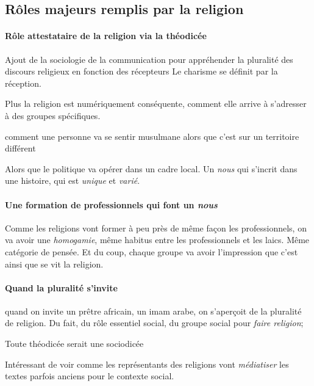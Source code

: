 \subsection{ Rôles majeurs remplis par la religion}

\paragraph{Rôle attestataire de la religion via la théodicée}
\begin{Prop}
         Ajout de la sociologie de la communication pour appréhender la pluralité des discours religieux en fonction des récepteurs 
         Le charisme se définit par la réception.    
\end{Prop}
Plus la religion est numériquement conséquente, comment elle arrive à s'adresser à des groupes spécifiques. 
\begin{Ex}
    comment une personne va se sentir musulmane alors que c'est sur un territoire différent
\end{Ex}
Alors que le politique va opérer dans un cadre local. Un \textit{nous} qui s'incrit dans une histoire, qui est \textit{unique} et \textit{varié}.

\paragraph{Une formation de professionnels qui font un \textit{nous}} Comme les religions vont former à peu près de même façon les professionnels, on va avoir une \textit{homogamie}, même habitus entre les professionnels et les laics. Même catégorie de pensée. Et du coup, chaque groupe va avoir l'impression que c'est ainsi que se vit la religion.

\paragraph{Quand la pluralité s'invite} quand on invite un prêtre africain, un imam arabe, on s'aperçoit de la pluralité de religion.
Du fait, du rôle essentiel social, du groupe social pour \textit{faire religion}; 
\begin{Prop}
    Toute théodicée serait une sociodicée
\end{Prop}

      Intéressant de voir comme les représentants des religions vont \textit{médiatiser } les textes parfois anciens pour le contexte social.

